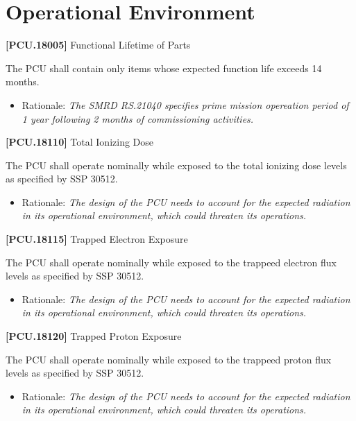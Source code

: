 \section{Operational Environment}
\label{operationalenvironment}

\textbf{[PCU.18005]} Functional Lifetime of Parts

The \gls{PCU} shall contain only items whose expected function life exceeds 14 months.

\begin{itemize}
\item{} Rationale: \emph{The SMRD RS.21040 specifies prime mission opereation period of 1 year following 2 months of commissioning activities.}

\end{itemize}

\textbf{[PCU.18110]} Total Ionizing Dose

The \gls{PCU} shall operate nominally while exposed to the total ionizing dose levels as specified by SSP 30512.

\begin{itemize}
\item{} Rationale: \emph{The design of the PCU needs to account for the expected radiation in its operational environment, which could threaten its operations.}

\end{itemize}

\textbf{[PCU.18115]} Trapped Electron Exposure

The \gls{PCU} shall operate nominally while exposed to the trappeed electron flux levels as specified by SSP 30512.

\begin{itemize}
\item{} Rationale: \emph{The design of the PCU needs to account for the expected radiation in its operational environment, which could threaten its operations.}

\end{itemize}

\textbf{[PCU.18120]} Trapped Proton Exposure

The \gls{PCU} shall operate nominally while exposed to the trappeed proton flux levels as specified by SSP 30512.

\begin{itemize}
\item{} Rationale: \emph{The design of the PCU needs to account for the expected radiation in its operational environment, which could threaten its operations.}

\end{itemize}

